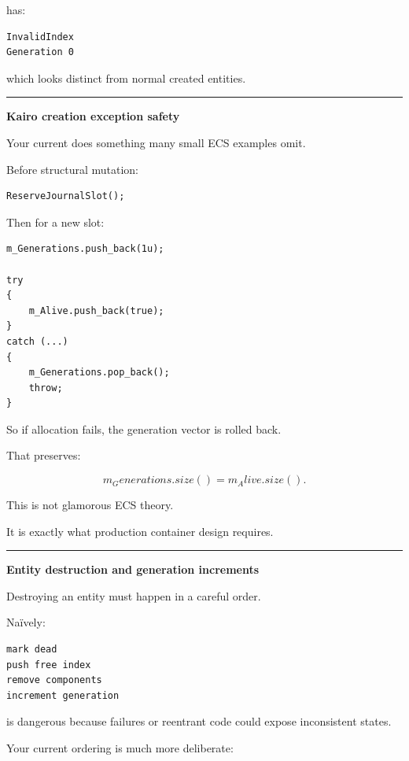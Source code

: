has:

\begin{verbatim}
InvalidIndex
Generation 0
\end{verbatim}

which looks distinct from normal created entities.

\begin{center}\rule{0.5\linewidth}{0.5pt}\end{center}

\textbf{Kairo creation exception safety}

Your current  does something many small ECS examples omit.

Before structural mutation:

\begin{verbatim}
ReserveJournalSlot();
\end{verbatim}

Then for a new slot:

\begin{verbatim}
m_Generations.push_back(1u);

try
{
    m_Alive.push_back(true);
}
catch (...)
{
    m_Generations.pop_back();
    throw;
}
\end{verbatim}

So if  allocation fails, the generation vector is rolled back.

That preserves:

\[
m_Generations.size()
=
m_Alive.size().
\]

This is not glamorous ECS theory.

It is exactly what production container design requires.

\begin{center}\rule{0.5\linewidth}{0.5pt}\end{center}

\textbf{Entity destruction and generation increments}

Destroying an entity must happen in a careful order.

Naïvely:

\begin{verbatim}
mark dead
push free index
remove components
increment generation
\end{verbatim}

is dangerous because failures or reentrant code could expose inconsistent states.

Your current ordering is much more deliberate:

